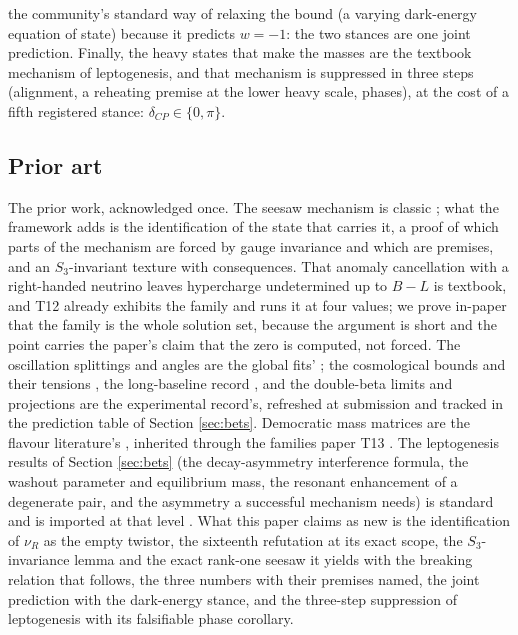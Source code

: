 \documentclass[11pt]{article}
\theoremstyle{definition}
\begin{document}
the community's standard way of relaxing the bound (a varying dark-energy equation of state) because it predicts $w = -1$: the two stances are one joint prediction. Finally, the heavy states that make the masses are the textbook mechanism of leptogenesis, and that mechanism is suppressed in three steps (alignment, a reheating premise at the lower heavy scale, phases), at the cost of a fifth registered stance: $\delta_{CP} \in \{0, \pi\}$.

\subsection*{Prior art}

The prior work, acknowledged once. The seesaw mechanism is classic \cite{Minkowski1977, GRS1979, Yanagida1980, MohapatraSenjanovic1980}; what the framework adds is the identification of the state that carries it, a proof of which parts of the mechanism are forced by gauge invariance and which are premises, and an $S_{3}$-invariant texture with consequences. That anomaly cancellation with a right-handed neutrino leaves hypercharge undetermined up to $B - L$ is textbook, and T12 already exhibits the family and runs it at four values; we prove in-paper that the family is the whole solution set, because the argument is short and the point carries the paper's claim that the zero is computed, not forced. The oscillation splittings and angles are the global fits' \cite{PDG2024, NuFIT2024}; the cosmological bounds and their tensions \cite{DESI2025, HouWangZhaoZhang2026}, the long-baseline record \cite{T2KNOvA2025}, and the double-beta limits and projections \cite{KamLANDZen2023, LEGEND2021} are the experimental record's, refreshed at submission and tracked in the prediction table of Section \ref{sec:bets}. Democratic mass matrices are the flavour literature's \cite{HHW1978}, inherited through the families paper T13 \cite{ButlerT13}. The leptogenesis results of Section \ref{sec:bets} (the decay-asymmetry interference formula, the washout parameter and equilibrium mass, the resonant enhancement of a degenerate pair, and the asymmetry a successful mechanism needs) is standard and is imported at that level \cite{FukugitaYanagida1986, DavidsonNardiNir2008, PilaftsisUnderwood2004}. What this paper claims as new is the identification of $\nu_{R}$ as the empty twistor, the sixteenth refutation at its exact scope, the $S_{3}$-invariance lemma and the exact rank-one seesaw it yields with the breaking relation that follows, the three numbers with their premises named, the joint prediction with the dark-energy stance, and the three-step suppression of leptogenesis with its falsifiable phase corollary.
\end{document}
